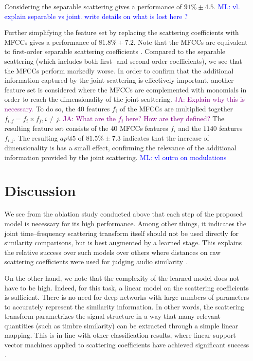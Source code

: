 \documentclass{bmcart}
\newcommand{\nmu}{}
\newcommand{\ml}[1]{\textcolor{blue}{ML: #1}\xspace}
\newcommand{\ja}[1]{\textcolor{purple}{JA: #1}\xspace}
\begin{document}
Considering the separable scattering gives a performance of $91\% \pm 4.5$. \ml{ vl. explain separable vs joint. write details on what is lost here ?}

Further simplifying the feature set by replacing the scattering coefficients with MFCCs gives a performance of $81.8\% \pm 7.2$.
Note that the MFCCs are equivalent to first-order separable scattering coefficients \cite{anden2014tsp}.
Compared to the separable scattering (which includes both first- and second-order coefficients), we see that the MFCCs perform markedly worse.
In order to confirm that the additional information captured by the joint scattering is effectively important, another feature set is considered where the MFCCs are complemented with monomials in order to reach the dimensionality of the joint scattering.
\ja{Explain why this is necessary.}%
To do so, the $40$ features $f_i$ of the MFCCs are multiplied together $f_{i, j} = f_i \times f_j, i \neq j$.
\ja{What are the $f_i$ here?
How are they defined?}%
The resulting feature set consists of the 40 MFCCs features $f_i$ and the $1140$ features $f_{i, j}$.
The resulting $ap@5$ of $81.5\% \pm 7.3$ indicates that the increase of dimensionality is has a small effect, confirming the relevance of the additional information provided by the joint scattering.
\ml{vl outro on modulations}


\section*{\nmu Discussion}
\label{sec:discussion}

We see from the ablation study conducted above that each step of the proposed model is necessary for its high performance.
Among other things, it indicates the joint time--frequency scattering transform itself should not be used directly for similarity comparisons, but is best augmented by a learned stage.
This explains the relative success over such models \cite{lostanlen2018jasmp,lostanlen2018extended} over others where distances on raw scattering coefficients were used for judging audio similarity \cite{bauge2013representing}.

On the other hand, we note that the complexity of the learned model does not have to be high.
Indeed, for this task, a linear model on the scattering coefficients is sufficient.
There is no need for deep networks with large numbers of parameters to accurately represent the similarity information.
In other words, the scattering transform parametrizes the signal structure in a way that many relevant quantities (such as timbre similarity) can be extracted through a simple linear mapping.
This is in line with other classification results, where linear support vector machines applied to scattering coefficients have achieved significant success \cite{anden2015mlsp,anden2019tsp}.
\end{document}
